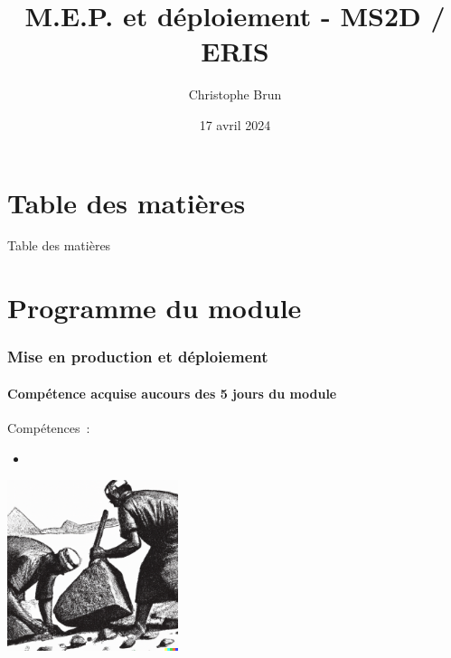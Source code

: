 \documentclass{beamer}
\title{M.E.P. et déploiement - MS2D / ERIS}
\author{Christophe Brun}
\institute{Campus Saint-Michel IT}
\date{17 avril 2024}
\begin{document}
    \begin{frame}
        \transdissolve
        \titlepage
    \end{frame}


    \section{Table des matières}\label{sec:toc}

    \begin{frame}{Table des matières}
        \tableofcontents
    \end{frame}


    \section{Programme du module}\label{sec:programme-du-module}

    \begin{frame}
        \frametitle{Mise en production et déploiement}
        \framesubtitle{Compétence acquise aucours des 5 jours du module}
        \transdissolve
        Compétences~:
        \begin{itemize}
            \item {}
        \end{itemize}
        \bigbreak
        \centering
        \includegraphics[width=5cm]{image/engraving-of-egyptian-workers-pulling-stones}
    \end{frame}
\end{document}
